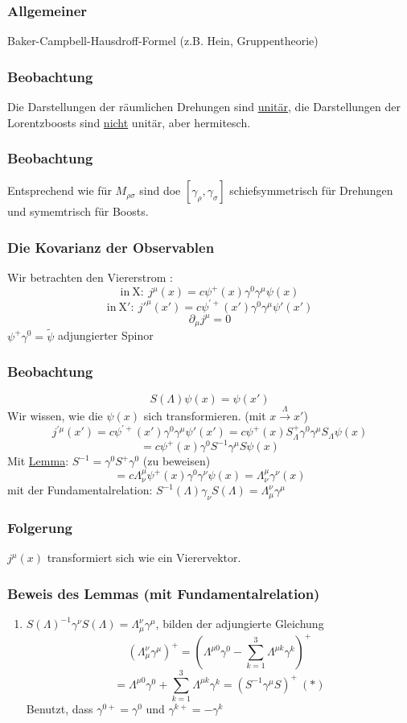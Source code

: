 \documentclass[twoside,a4paper]{scrartcl}
\renewcommand{\1}{\mathds{1}}
\newcommand{\ra}{\rightarrow}
\renewcommand{\L}{\Lambda}
\begin{document}
\subsubsection*{Allgemeiner}
Baker-Campbell-Hausdroff-Formel (z.B.  Hein, Gruppentheorie)
\subsubsection*{Beobachtung}
Die Darstellungen der räumlichen Drehungen sind \underline{unitär}, die Darstellungen der Lorentzboosts sind \underline{nicht} unitär, aber hermitesch.
\subsubsection*{Beobachtung}
Entsprechend wie für $M_{\rho\sigma}$ sind doe $[\gamma_\rho,\gamma_\sigma]$ schiefsymmetrisch für Drehungen und symemtrisch für Boosts.

\subsubsection{Die Kovarianz der Observablen}
Wir betrachten den Viererstrom :
$$\mathrm{in \ X: \ } j^{\mu}(x)=c\psi^+(x)\gamma^0 \gamma^\mu \psi(x)$$
$$\mathrm{in \ X': \ } j'^{\mu}(x')=c\psi^{'+}(x')\gamma^0 \gamma^\mu \psi'(x')$$
$$\partial_\mu j^\mu=0$$
$\psi^+\gamma^0=\tilde \psi$ adjungierter Spinor

\subsubsection*{Beobachtung}
$$S(\L)\psi(x)=\psi(x')$$
Wir wissen, wie die $\psi(x)$ sich transformieren. (mit $x \stackrel{\L}{\ra} x'$)
$$j^{'\mu}(x')=c\psi^{'+}(x')\gamma^0 \gamma^\mu \psi'(x')=c\psi^+(x)S_{\L}^+\gamma^0\gamma^\mu S_{\L}\psi(x)$$
$$=c \psi^+(x)\gamma^0S^{-1}\gamma^\mu S \psi(x)$$
Mit \underline{Lemma}: $S^{-1}=\gamma^0S^+\gamma^0$ (zu beweisen)
$$=c  \L_\nu^\mu\psi^+(x)\gamma^0 \gamma^\nu \psi(x)=\L_\nu^\mu\gamma^\nu(x)$$
mit der Fundamentalrelation: $S^{-1}(\L)\gamma_\nu S(\L)=\L_\mu^\nu \gamma^\mu$
\subsubsection*{Folgerung}
$j^\mu(x)$ transformiert sich wie ein Vierervektor.
\subsubsection*{Beweis des Lemmas (mit Fundamentalrelation)}
\begin{enumerate}
\item $S(\L)^{-1}\gamma^\nu S(\L)=\L_\mu^\nu\gamma^\mu$, bilden der adjungierte Gleichung
$$(\L_\mu^\nu\gamma^\mu)^+=(\L^{\mu0}\gamma^0-\sum_{k=1}^3 \L^{\mu k}\gamma^k)^+$$
$$=\L^{\mu 0}  \gamma^0+\sum_{k=1}^3 \L^{\mu k} \gamma^k=(S^{-1} \gamma^\mu S)^+ \ (*)$$
Benutzt, dass $\gamma^{0+}=\gamma^0$ und $\gamma^{k+}=-\gamma^k$
\end{enumerate}
\end{document}
